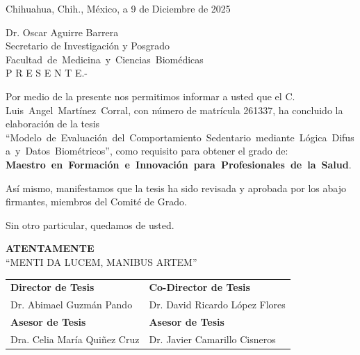 \documentclass[12pt,letterpaper,oneside]{report}
\newcommand{\miFacultad}{Facultad~de~Medicina~y~Ciencias~Biom\'edicas}  %
\newcommand{\miGrado}{Maestro~en~Formaci\'on~e~Innovaci\'on~para~Profesionales~de~la~Salud}  %
\newcommand{\miTitulo}{Modelo~de~Evaluaci\'on~del~Comportamiento~Sedentario~mediante~L\'ogica~Difusa~y~Datos~Biom\'etricos}  %
\newcommand{\miAutor}{Luis~Angel~Mart\'inez~Corral}  %
\newcommand{\miCiudad}{Chihuahua, Chih., M\'exico}
\newcommand{\miFecha}{9 de Diciembre de 2025}
\newcommand{\miSecretario}{Dr. Oscar Aguirre Barrera}
\newcommand{\miSecretarioCargo}{Secretario de Investigaci\'on y Posgrado}
\begin{document}
\begin{flushright}
{\fontsize{12}{14}\selectfont \miCiudad, a \miFecha}\\[0.3cm]
\end{flushright}

\noindent
{\fontsize{12}{14}\selectfont 
\miSecretario\\[0.1cm]
\miSecretarioCargo\\[0.1cm]
\miFacultad\\[0.3cm]

P {\hspace{0.15cm}} R {\hspace{0.15cm}} E {\hspace{0.15cm}} S {\hspace{0.15cm}} E {\hspace{0.15cm}} N {\hspace{0.15cm}} T {\hspace{0.15cm}} E.-\\[0.3cm]
}

{\fontsize{12}{14}\selectfont
\setlength{\parindent}{0cm}   %
\setlength{\parskip}{0.2cm}   %

\noindent Por medio de la presente nos permitimos informar a usted que el C. \miAutor, con n\'umero de matr\'icula 261337, ha concluido la elaboraci\'on de la tesis ``\miTitulo'', como requisito para obtener el grado de: \textbf{\miGrado}.

As\'i mismo, manifestamos que la tesis ha sido revisada y aprobada por los abajo firmantes, miembros del Comit\'e de Grado.

Sin otro particular, quedamos de usted.

}

\begin{center}
{\fontsize{12}{14}\selectfont\bfseries ATENTAMENTE}\\[0.3cm]
{\fontsize{12}{14}\selectfont ``MENTI DA LUCEM, MANIBUS ARTEM''}\\[0.5cm]
\end{center}

\begin{center}
\begin{tabular}{@{}p{6.5cm}p{6.5cm}@{}}
\rule{0pt}{10pt}\textbf{Director de Tesis} & \textbf{Co-Director de Tesis}\\[0.3cm]

Dr. Abimael Guzm\'an Pando & Dr. David Ricardo L\'opez Flores\\[0.8cm]

\textbf{Asesor de Tesis} & \textbf{Asesor de Tesis}\\[0.3cm]

Dra. Celia Mar\'ia Qui\~nez Cruz & Dr. Javier Camarillo Cisneros\\[0.3cm]
\end{tabular}
\end{center}
\end{document}
